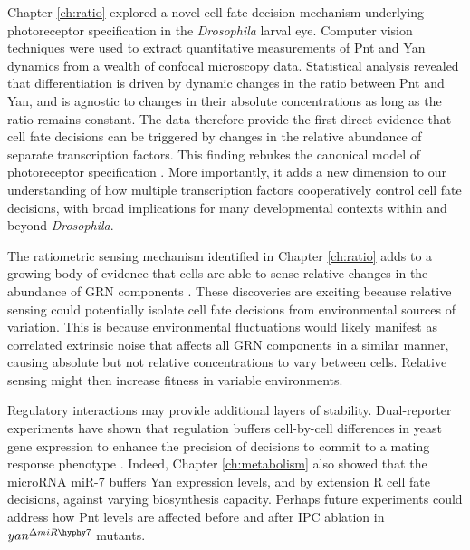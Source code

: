 Chapter \ref{ch:ratio} explored a novel cell fate decision mechanism underlying photoreceptor specification in the \textit{Drosophila} larval eye. Computer vision techniques were used to extract quantitative measurements of Pnt and Yan dynamics from a wealth of confocal microscopy data. Statistical analysis revealed that differentiation is driven by dynamic changes in the ratio between Pnt and Yan, and is agnostic to changes in their absolute concentrations as long as the ratio remains constant. The data therefore provide the first direct evidence that cell fate decisions can be triggered by changes in the relative abundance of separate transcription factors. This finding rebukes the canonical model of photoreceptor specification \cite{Graham2010}. More importantly, it adds a new dimension to our understanding of how multiple transcription factors cooperatively control cell fate decisions, with broad implications for many developmental contexts within and beyond \textit{Drosophila}. 

The ratiometric sensing mechanism identified in Chapter \ref{ch:ratio} adds to a growing body of evidence that cells are able to sense relative changes in the abundance of GRN components \cite{Goentoro2009a,Frick2017}. These discoveries are exciting because relative sensing could potentially isolate cell fate decisions from environmental sources of variation. This is because environmental fluctuations would likely manifest as correlated extrinsic noise that affects all GRN components in a similar manner, causing absolute but not relative concentrations to vary between cells. Relative sensing might then increase fitness in variable environments. 

Regulatory interactions may provide additional layers of stability. Dual-reporter experiments have shown that regulation buffers cell-by-cell differences in yeast gene expression to enhance the precision of decisions to commit to a mating response phenotype \cite{Colman-Lerner2005}. Indeed, Chapter \ref{ch:metabolism} also showed that the microRNA miR-7 buffers Yan expression levels, and by extension R cell fate decisions, against varying biosynthesis capacity. Perhaps future experiments could address how Pnt levels are affected before and after IPC ablation in $yan^{\Delta miR\hyphy 7}$ mutants. 

